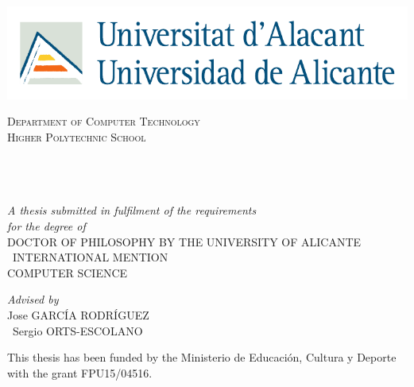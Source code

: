 \begin{titlepage}
\begin{center}
	
\includegraphics[width=0.64\linewidth]{figures/logoua}

\vfill

\textsc{\LARGE Department of Computer Technology}\\[1.5cm] %
\textsc{\Large Higher Polytechnic School}\\[0.5cm] %

{\huge \bfseries \ttitle}\\[0.4cm] %
 
\begin{center} \large
{\authorname} %
\\\ \\
\emph{A thesis submitted in fulfilment of the requirements\\ for the degree of } \\
{DOCTOR OF PHILOSOPHY BY THE UNIVERSITY OF ALICANTE}\\\
{INTERNATIONAL MENTION}\\
{COMPUTER SCIENCE}\\
\end{center}

\vfill
 
\large \textit{Advised by}\\[0.3cm] %
{Jose GARCÍA RODRÍGUEZ}\\\
{Sergio ORTS-ESCOLANO}\\
 
 \vfill
 
{\large This thesis has been funded by the Ministerio de Educación, Cultura y Deporte with the grant FPU15/04516.}\\[4cm] %
 
\end{center}
\end{titlepage}
